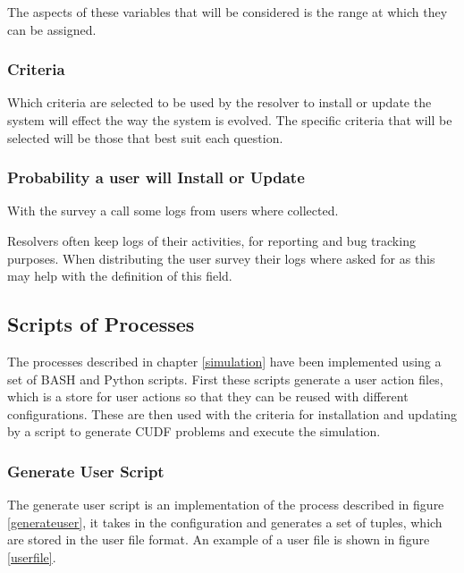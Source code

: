 The aspects of these variables that will be considered is the range at which they can be assigned.

\subsubsection{Criteria}
Which criteria are selected to be used by the resolver to install or update the system will effect the way the system is evolved.
The specific criteria that will be selected will be those that best suit each question. 


\subsubsection{Probability a user will Install or Update}

With the survey a call some logs from users where collected.


Resolvers often keep logs of their activities, for reporting and bug tracking purposes.
When distributing the user survey their logs where asked for as this may help with the definition of this field.


\subsection{Scripts of Processes}
The processes described in chapter \ref{simulation} have been implemented using a set of BASH and Python scripts.
First these scripts generate a user action files, which is a store for user actions so that they can be reused with different configurations.
These are then used with the criteria for installation and updating by a script to generate CUDF problems and execute the simulation.

\subsubsection{Generate User Script}
The generate user script is an implementation of the process described in figure \ref{generateuser}, it takes in the configuration and generates a set of tuples, which are stored in the user file format.
An example of a user file is shown in figure \ref{userfile}.

